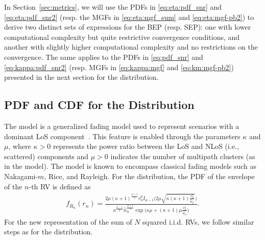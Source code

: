 \documentclass[journal,twocolumn]{IEEEtran}
\begin{document}
In Section~\ref{sec:metrics}, we will use the \acp{PDF} in \eqref{eq:eta:pdf_snr} and \eqref{eq:eta:pdf_snr2} (resp. the \acp{MGF} in \eqref{eq:eta:mgf_sum} and \eqref{eq:eta:mgf-pb2}) to derive two distinct sets of expressions for the \ac{BEP} (resp. \ac{SEP}): one with lower computational complexity but quite restrictive convergence conditions, and another with slightly higher computational complexity and no restrictions on the convergence. The same applies to the \acp{PDF} in \eqref{eq:pdf_snr} and \eqref{eq:kappa:pdf_snr2} (resp. \acp{MGF} in \eqref{eq:kappa:mgf} and \eqref{eq:km:mgf-pb2}) presented in the next section for the \km{} distribution.

\subsection{\ac{PDF} and \ac{CDF} for the \km{} Distribution} \label{sec:newrep_km}

The \km{} model is a generalized fading model used to represent scenarios with a dominant \ac{LoS} component~\cite{Yac07}. This feature is enabled through the parameters $\kappa$ and $\mu$, where $\kappa > 0$ represents the power ratio between the \ac{LoS} and \ac{NLoS} (i.e., scattered) components and $\mu > 0$ indicates the number of multipath clusters (as in the \Ehm{} model). The \km{} model is known to encompass classical fading models such as Nakagami-$m$, Rice, and Rayleigh. For the \km{} distribution, the \ac{PDF} of the envelope of the $n$-th \ac{RV} is defined as~\cite[Eq.~(1)]{Yac07}
\begin{align} \label{eq:pdfkappa}
    f_{R_n}(r_n) = \frac{2 \mu  (\kappa +1)^{\frac{\mu +1}{2}} r_n^{\mu} I_{\mu -1}\big(2 \mu  \sqrt{\kappa  (\kappa +1) \frac{r_{n}^{2}}{\hat{w}_{n}}}\big)}{\kappa ^{\frac{\mu -1}{2}} \hat{w}_{n}^{\frac{\mu +1}{2}} \exp \big(\kappa  \mu +(\kappa +1) \mu  \frac{r_{n}^{2}}{\hat{w}_{n}}\big)}.
\end{align}
For the new representation of the sum of $N$ squared \ac{i.i.d.} \km{} \acp{RV}, we follow similar steps as for the \Ehm{} distribution.
\end{document}
